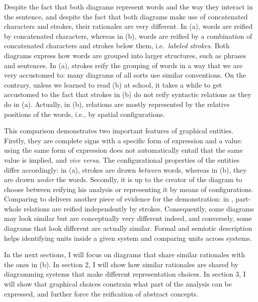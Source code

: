 \documentclass[output=paper]{langsci/langscibook}
\begin{document}
Despite the fact that both diagrams represent words and the way they interact in the sentence, and despite the fact that both diagrams make use of concatenated characters and strokes, their rationales are very different. In (a), words are reified by concatenated characters, whereas in (b), words are reified by a combination of concatenated characters and strokes below them, i.e.~\textit{labeled} \textit{strokes}. Both diagrams express how words are grouped into larger structures, such as phrases and sentences. In (a), strokes reify the grouping of words in a way that we are very accustomed to: many diagrams of all sorts use similar conventions. On the contrary, unless we learned to read (b) at school, it takes a while to get accustomed to the fact that strokes in (b) do not reify syntactic relations as they do in (a). Actually, in (b), relations are mostly represented by the relative positions of the words, i.e., by spatial configurations.

This comparison demonstrates two important features of graphical entities. Firstly, they are complete signs with a specific form of expression and a value: using the same form of expression does not automatically entail that the same value is implied, and \textit{vice} \textit{versa}. The configurational properties of the entities differ accordingly: in (a), strokes are drawn \textit{between} words, whereas in (b), they are drawn \textit{under} the words. Secondly, it is up to the creator of the diagram to choose between reifying his analysis or representing it by means of configurations. Comparing  to  delivers another piece of evidence for the demonstration: in , part-whole relations are reified independently by strokes. Consequently, some diagrams may look similar but are conceptually very different indeed, and conversely, some diagrams that look different are actually similar. Formal and semiotic description helps identifying units inside a given system and comparing units across systems. 

In the next sections, I will focus on diagrams that share similar rationales with the ones in (b). In section 2, I will show how similar rationales are shared by diagramming systems that make different representation choices. In section 3, I will show that graphical choices constrain what part of the analysis can be expressed, and further force the reification of abstract concepts.
\end{document}
